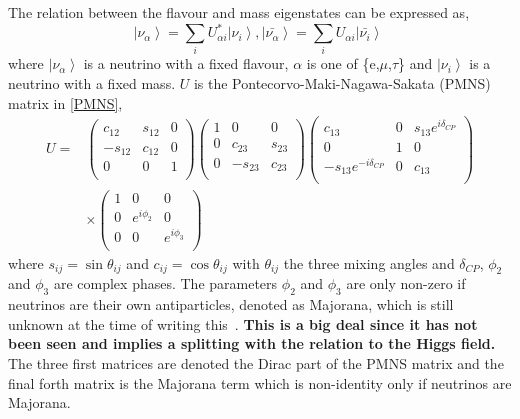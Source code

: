 The relation between the flavour and mass eigenstates can be expressed as,
\begin{equation}
\label{eq:eigenstates}
 \left| \nu_\alpha \right\rangle = \sum_{i} U^{*}_{\alpha i} \left| \nu_i \right\rangle,
 \left| \bar{\nu_\alpha} \right\rangle = \sum_{i} U_{\alpha i} \left| \bar{\nu_i} \right\rangle\
 \end{equation}
where
 $\left| \nu_\alpha \right\rangle $ is a neutrino with a fixed flavour, $\alpha$ is one of \{e,$\mu$,$\tau$\} and  $\left| \nu_i \right\rangle$ is a neutrino with a fixed mass.
$U$ is the Pontecorvo-Maki-Nagawa-Sakata (PMNS) matrix in \eqref{PMNS},
\begin{equation}
\label{PMNS}
\begin{aligned}
U ={} & 
 \begin{pmatrix}
 c_{12} & s_{12} & 0\\
  -s_{12} & c_{12} & 0\\
  0 & 0 & 1\\
 \end{pmatrix} 
  \begin{pmatrix}
 1 & 0 & 0\\
  0 & c_{23} & s_{23}\\
  0 & -s_{23} & c_{23}\\
 \end{pmatrix} 
   \begin{pmatrix}
 c_{13} & 0 & s_{13}e^{i\delta_{CP}}\\
  0 & 1 & 0\\
  -s_{13}e^{-i\delta_{CP}} & 0 & c_{13}\\
 \end{pmatrix} 
 \\
 & \times
  \begin{pmatrix}
1 & 0& 0\\
  0 & e^{i\phi_2} & 0\\
  0 & 0 & e^{i\phi_3}\\
 \end{pmatrix} 
 \end{aligned}
\end{equation}
where $s_{ij} = \sin\theta_{ij}$ and $c_{ij} = \cos\theta_{ij}$ with $\theta_{ij}$ the three mixing angles and $\delta_{CP}$, $\phi_2$ and $\phi_3$ are complex phases. The parameters $\phi_2$ and $\phi_3$ are only non-zero if neutrinos are their own antiparticles, denoted as Majorana, which is still unknown at the time of writing this~\cite{13PDG}.  \textbf{This is a big deal since it has not been seen and implies a splitting with the relation to the Higgs field. } The three first matrices are denoted the Dirac part of the PMNS matrix and the final forth matrix is the Majorana term which is non-identity only if neutrinos are Majorana.

